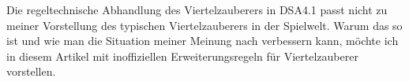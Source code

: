Die regeltechnische Abhandlung des Viertelzauberers in DSA4.1 passt nicht zu meiner Vorstellung des typischen Viertelzauberers in der Spielwelt. Warum das so ist und wie man die Situation meiner Meinung nach verbessern kann, möchte ich in diesem Artikel mit inoffiziellen Erweiterungsregeln für Viertelzauberer vorstellen.
